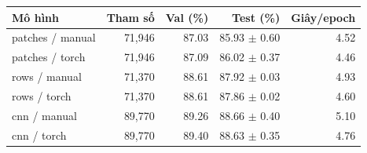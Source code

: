 \begin{tabularx}{\textwidth}{@{}Xrrrr@{}}
\toprule
Mô hình & Tham số & Val (\%) & Test (\%) & Giây/epoch \\
\midrule
patches / manual & 71,946 & 87.03 & 85.93 $\pm$ 0.60 & 4.52 \\
patches / torch & 71,946 & 87.09 & 86.02 $\pm$ 0.37 & 4.46 \\
rows / manual & 71,370 & 88.61 & 87.92 $\pm$ 0.03 & 4.93 \\
rows / torch & 71,370 & 88.61 & 87.86 $\pm$ 0.02 & 4.60 \\
cnn / manual & 89,770 & 89.26 & 88.66 $\pm$ 0.40 & 5.10 \\
cnn / torch & 89,770 & 89.40 & 88.63 $\pm$ 0.35 & 4.76 \\
\bottomrule
\end{tabularx}
